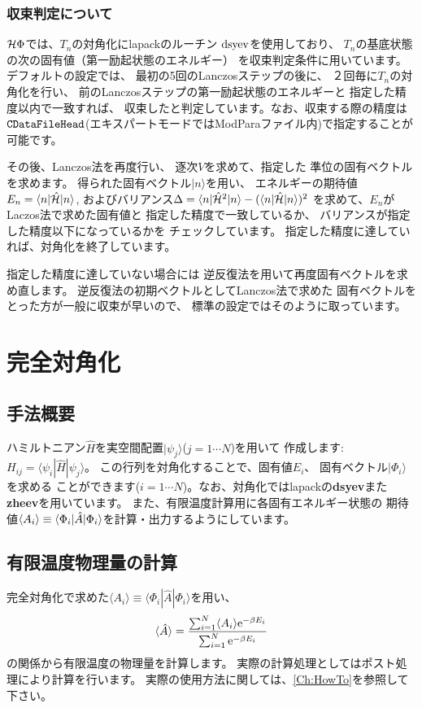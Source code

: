 \subsubsection*{収束判定について}
$\mathcal{H} \Phi$では、$T_{n}$の対角化にlapackのルーチン
$\rm dsyev$を使用しており、
$T_{n}$の基底状態の次の固有値（第一励起状態のエネルギー）
を収束判定条件に用いています。
デフォルトの設定では、
最初の5回のLanczosステップの後に、
２回毎に$T_{n}$の対角化を行い、
前のLanczosステップの第一励起状態のエネルギーと
指定した精度以内で一致すれば、
収束したと判定しています。なお、収束する際の精度は$\verb|CDataFileHead| $(エキスパートモードではModParaファイル内)で指定することが可能です。

その後、Lanczos法を再度行い、
逐次$V$を求めて、指定した
準位の固有ベクトルを求めます。
得られた固有ベクトル$|n\rangle$を用い、
エネルギーの期待値$E_{n}=\langle n|\hat{\mathcal{H}}|n\rangle $,
およびバリアンス$\Delta=\langle n|\hat{\mathcal{H}}^{2}|n\rangle -(\langle n|\hat{\mathcal{H}}|n\rangle)^2$
を求めて、$E_{n}$がLaczos法で求めた固有値と
指定した精度で一致しているか、
バリアンスが指定した精度以下になっているかを
チェックしています。
指定した精度に達していれば、対角化を終了しています。

指定した精度に達していない場合には
逆反復法を用いて再度固有ベクトルを求め直します。
逆反復法の初期ベクトルとしてLanczos法で求めた
固有ベクトルをとった方が一般に収束が早いので、
標準の設定ではそのように取っています。

\section{完全対角化}
\label{Ch:AllDiagonalization}
\subsection{手法概要}
ハミルトニアン${\hat{H}}$を実空間配置$| \psi_j \rangle$($j=1\cdots N$)を用いて
作成します: $H_{ij}= \langle \psi_i | {\hat H} | \psi_j \rangle$。
この行列を対角化することで、固有値$E_i$、 固有ベクトル$|\Phi_i\rangle$を求める
ことができます($i=1 \cdots N$)。なお、対角化ではlapackの{\bf dsyev}また
{\bf zheev}を用いています。
また、有限温度計算用に各固有エネルギー状態の
期待値$\langle A_i\rangle \equiv \langle \Phi_i | {\hat A} | \Phi_i\rangle$を計算・出力するようにしています。
\subsection{有限温度物理量の計算}
完全対角化で求めた$\langle A_i\rangle \equiv \langle \Phi_i | {\hat A} | \Phi_i\rangle$を用い、
\begin{equation}
\langle {\hat A}\rangle=\frac{\sum_{i=1}^N \langle A_i\rangle {\rm  e}^{-\beta E_i}}{\sum_{i=1}^N{\rm  e}^{-\beta E_i}}
\end{equation}
の関係から有限温度の物理量を計算します。
実際の計算処理としてはポスト処理により計算を行います。
実際の使用方法に関しては、\ref{Ch:HowTo}を参照して下さい。

